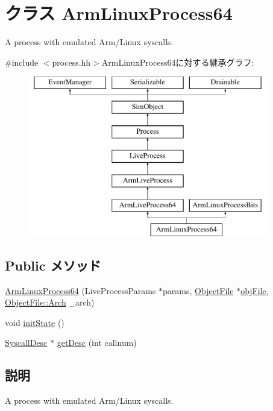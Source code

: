 \hypertarget{classArmLinuxProcess64}{
\section{クラス ArmLinuxProcess64}
\label{classArmLinuxProcess64}
}


A process with emulated Arm/Linux syscalls.  


{\ttfamily \#include $<$process.hh$>$}ArmLinuxProcess64に対する継承グラフ:\begin{figure}[H]
\begin{center}
\leavevmode
\includegraphics[height=7cm]{classArmLinuxProcess64}
\end{center}
\end{figure}
\subsection*{Public メソッド}
\begin{DoxyCompactItemize}
\item 
\hyperlink{classArmLinuxProcess64_ad3971523367f3ae2de449cbf4d43521e}{ArmLinuxProcess64} (LiveProcessParams $\ast$params, \hyperlink{classObjectFile}{ObjectFile} $\ast$\hyperlink{classLiveProcess_ab6cfcfa7903c66267b3e0351c3caa809}{objFile}, \hyperlink{classObjectFile_a0ac03ab06a859320a9072002bdf3aa0f}{ObjectFile::Arch} \_\-arch)
\item 
void \hyperlink{classArmLinuxProcess64_a3c34ea9b29f410748d4435a667484924}{initState} ()
\item 
\hyperlink{classSyscallDesc}{SyscallDesc} $\ast$ \hyperlink{classArmLinuxProcess64_aebbff609a7235342925445690acf5ee8}{getDesc} (int callnum)
\end{DoxyCompactItemize}


\subsection{説明}
A process with emulated Arm/Linux syscalls. 

